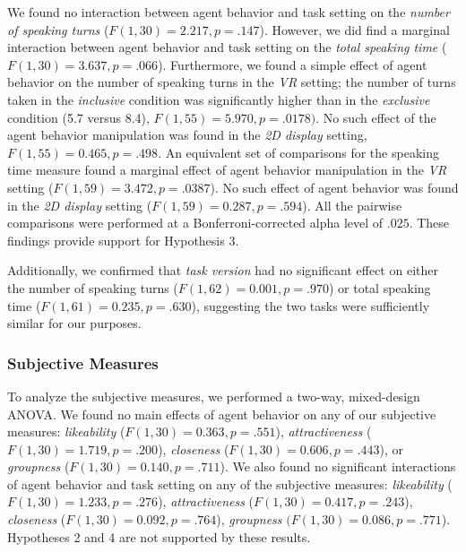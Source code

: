 We found no interaction between agent behavior and task setting on the \emph{number of speaking turns} ($F(1, 30) = 2.217, p = .147$). However, we did find a marginal interaction between agent behavior and task setting on the \emph{total speaking time} ($F(1, 30) = 3.637, p = .066$). Furthermore, we found a simple effect of agent behavior on the number of speaking turns in the \emph{VR} setting; the number of turns taken in the \emph{inclusive} condition was significantly higher than in the \emph{exclusive} condition (5.7 versus 8.4), $F(1, 55) = 5.970, p = .0178)$. No such effect of the agent behavior manipulation was found in the \emph{2D display} setting, $F(1, 55) = 0.465, p = .498$. An equivalent set of comparisons for the speaking time measure found a marginal effect of agent behavior manipulation in the \emph{VR} setting ($F(1, 59) = 3.472, p = .0387$). No such effect of agent behavior was found in the \emph{2D display} setting ($F(1, 59) = 0.287, p = .594$). All the pairwise comparisons were performed at a Bonferroni-corrected alpha level of $.025$. These findings provide support for Hypothesis 3.

Additionally, we confirmed that \emph{task version} had no significant effect on either the number of speaking turns ($F(1, 62) = 0.001, p = .970$) or total speaking time ($F(1, 61) = 0.235, p = .630$), suggesting the two tasks were sufficiently similar for our purposes.

\subsubsection{Subjective Measures}

To analyze the subjective measures, we performed a two-way, mixed-design ANOVA. We found no main effects of agent behavior on any of our subjective measures: \emph{likeability} ($F(1, 30) = 0.363, p = .551$), \emph{attractiveness} ($F(1, 30) = 1.719, p = .200$), \emph{closeness} ($F(1, 30) = 0.606, p = .443$), or \emph{groupness} ($F(1, 30) = 0.140, p = .711$). We also found no significant interactions of agent behavior and task setting on any of the subjective measures: \emph{likeability} ($F(1, 30) = 1.233, p = .276$), \emph{attractiveness} ($F(1, 30) = 0.417, p = .243$), \emph{closeness} ($F(1, 30) = 0.092, p = .764$), \emph{groupness} $(F(1, 30) = 0.086, p = .771$). Hypotheses 2 and 4 are not supported by these results.

